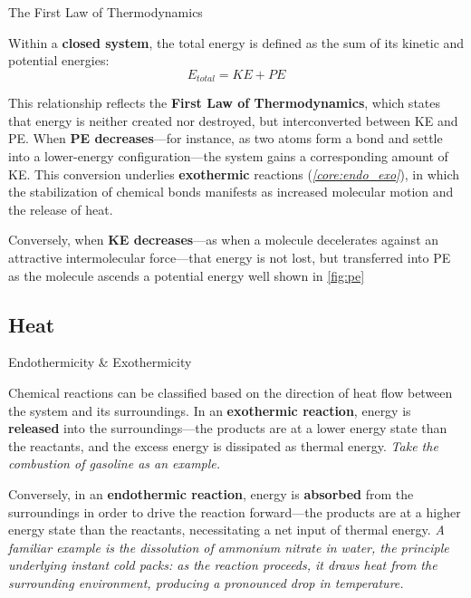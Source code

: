 \documentclass[10pt]{article}
\begin{document}
    \begin{core}{The First Law of Thermodynamics}

      Within a \textbf{closed system}, the total energy is defined as the sum of its kinetic and potential energies:
      \[
        E_{total} = KE + PE
      \]

      This relationship reflects the \textbf{First Law of Thermodynamics}, which states that energy is neither created nor destroyed, but interconverted between KE and PE. When \textbf{PE decreases}---for instance, as two atoms form a bond and settle into a lower-energy configuration---the system gains a corresponding amount of KE. This conversion underlies \textbf{exothermic} reactions (\textit{\autoref{core:endo_exo}}), in which the stabilization of chemical bonds manifests as increased molecular motion and the release of heat.

      Conversely, when \textbf{KE decreases}---as when a molecule decelerates against an attractive intermolecular force---that energy is not lost, but transferred into PE as the molecule ascends a potential energy well shown in \autoref{fig:pe}

    \end{core}

  \subsection{Heat}

    \begin{core}[label=core:endo_exo]{Endothermicity \& Exothermicity}

      Chemical reactions can be classified based on the direction of heat flow between the system and its surroundings. In an \textbf{exothermic reaction}, energy is \textbf{released} into the surroundings---the products are at a lower energy state than the reactants, and the excess energy is dissipated as thermal energy. \textit{Take the combustion of gasoline as an example.}

      Conversely, in an \textbf{endothermic reaction}, energy is \textbf{absorbed} from the surroundings in order to drive the reaction forward---the products are at a higher energy state than the reactants, necessitating a net input of thermal energy. \textit{A familiar example is the dissolution of ammonium nitrate in water, the principle underlying instant cold packs: as the reaction proceeds, it draws heat from the surrounding environment, producing a pronounced drop in temperature.}

    \end{core}
\end{document}
